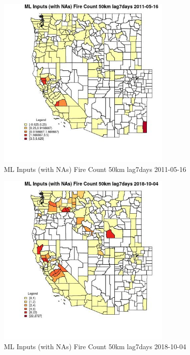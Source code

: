 \begin{figure} 
\centering  
\includegraphics[width=0.77\textwidth]{Code_Outputs/Report_ML_input_PM25_Step4_part_f_de_duplicated_aves_prioritize_24hr_obswNAs_CountyFire_Count_50km_lag7daysMean2011-05-16.jpg} 
\caption{\label{fig:Report_ML_input_PM25_Step4_part_f_de_duplicated_aves_prioritize_24hr_obswNAsCountyFire_Count_50km_lag7daysMean2011-05-16}ML Inputs (with NAs) Fire Count 50km lag7days 2011-05-16} 
\end{figure} 
 

\begin{figure} 
\centering  
\includegraphics[width=0.77\textwidth]{Code_Outputs/Report_ML_input_PM25_Step4_part_f_de_duplicated_aves_prioritize_24hr_obswNAs_CountyFire_Count_50km_lag7daysMean2018-10-04.jpg} 
\caption{\label{fig:Report_ML_input_PM25_Step4_part_f_de_duplicated_aves_prioritize_24hr_obswNAsCountyFire_Count_50km_lag7daysMean2018-10-04}ML Inputs (with NAs) Fire Count 50km lag7days 2018-10-04} 
\end{figure} 
 

